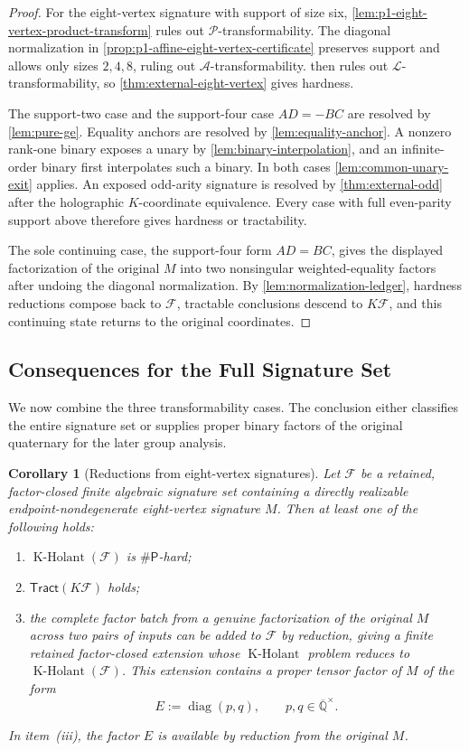 \documentclass[11pt,letterpaper,onecolumn]{article}
\theoremstyle{plain}
\newtheorem{corollary}[corollary]{Corollary}
\theoremstyle{definition}
\theoremstyle{remark}
\newcommand{\AlgNums}{\overline{\mathbb Q}}
\newcommand{\cF}{\mathcal F}
\newcommand{\cA}{\mathscr A}
\newcommand{\cP}{\mathscr P}
\newcommand{\cL}{\mathscr L}
\newcommand{\KHolant}{\operatorname{K\text{-}Holant}}
\newcommand{\Tract}{\mathsf{Tract}}
\newcommand{\SharpP}{\#\mathsf P}
\newcommand{\diag}{\operatorname{diag}}
\begin{document}
\begin{proof}
For the eight-vertex signature with support of size six,
\cref{lem:p1-eight-vertex-product-transform} rules out
\(\cP\)-transformability. The diagonal normalization in
\cref{prop:p1-affine-eight-vertex-certificate} preserves support and allows
only sizes \(2,4,8\), ruling out \(\cA\)-transformability.
 then rules out
\(\cL\)-transformability, so \cref{thm:external-eight-vertex} gives hardness.

The support-two case and the support-four case \(AD=-BC\) are resolved by
\cref{lem:pure-ge}. Equality anchors are resolved by
\cref{lem:equality-anchor}.  A nonzero rank-one binary exposes a unary by
\cref{lem:binary-interpolation}, and an infinite-order binary first
interpolates such a binary.  In both cases
\cref{lem:common-unary-exit} applies.  An exposed odd-arity signature is
resolved by \cref{thm:external-odd} after the holographic \(K\)-coordinate equivalence.
Every case with full even-parity support above therefore gives hardness or tractability.

The sole continuing case, the support-four form \(AD=BC\), gives the
displayed factorization of the original \(M\) into two nonsingular
weighted-equality factors after undoing the diagonal normalization.
By \cref{lem:normalization-ledger}, hardness reductions compose back
to \(\cF\), tractable conclusions descend to \(K\cF\), and this
continuing state returns to the original coordinates.
\end{proof}

\subsection{Consequences for the Full Signature Set}

We now combine the three transformability cases. The conclusion either
classifies the entire signature set or supplies proper binary factors of
the original quaternary for the later group analysis.

\begin{corollary}[Reductions from eight-vertex signatures]
\label{cor:p1-eight-vertex-reduced-interface}
Let \(\cF\) be a retained, factor-closed finite algebraic
signature set containing a directly realizable endpoint-nondegenerate eight-vertex signature \(M\).
Then at least one of the following holds:
\begin{enumerate}[label=\textnormal{(\roman*)}]
\item \(\KHolant(\cF)\) is \(\SharpP\)-hard;
\item \(\Tract(K\cF)\) holds;
\item the complete factor batch from a genuine factorization of the
      original \(M\) across two pairs of inputs can be added to
      \(\cF\) by reduction, giving a finite retained factor-closed
      extension whose \(\KHolant\) problem reduces to \(\KHolant(\cF)\). This extension
      contains a proper tensor factor of \(M\) of the form
      \[
        E:=\diag(p,q),\qquad p,q\in\AlgNums^\times.
      \]
\end{enumerate}
In item~(iii), the factor \(E\) is available by reduction from the original \(M\).
\end{corollary}
\end{document}
